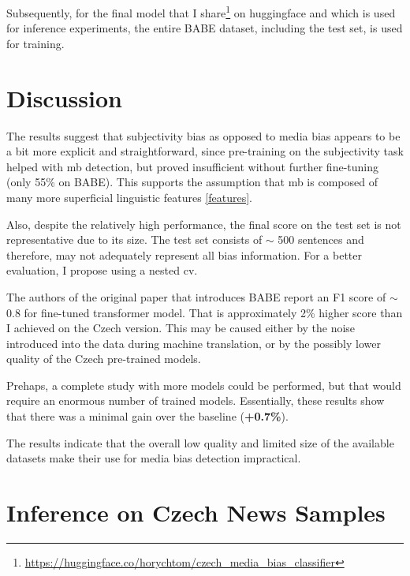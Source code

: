 Subsequently, for the final model that I share\footnote{\url{https://huggingface.co/horychtom/czech_media_bias_classifier}} on huggingface and which is used for inference experiments, the entire BABE dataset, including the test set, is used for training.

\section{Discussion}
The results suggest that subjectivity bias as opposed to media bias appears to be a bit more explicit and straightforward, since pre-training on the subjectivity task helped with \gls{mb} detection, but proved insufficient without further fine-tuning (only 55\% on BABE). This supports the assumption that \gls{mb} is composed of many more superficial linguistic features \ref{features}.

Also, despite the relatively high performance, the final score on the test set is not representative due to its size. The test set consists of $\sim$ 500 sentences and therefore, may not adequately represent all bias information. For a better evaluation, I propose using a nested \gls{cv}.

The authors of the original paper that introduces BABE \cite{spinde2021neural} report an F1 score of $\sim$ 0.8 for fine-tuned transformer model. That is approximately 2\% higher score than I achieved on the Czech version. This may be caused either by the noise introduced into the data during machine translation, or by the possibly lower quality of the Czech pre-trained models.

Prehaps, a complete study with more models could be performed, but that would require an enormous number of trained models. Essentially, these results show that there was a minimal gain over the baseline (\textbf{+0.7\%}).

The results indicate that the overall low quality and limited size of the available datasets make their use for media bias detection impractical.







\newpage

\section{Inference on Czech News Samples}\label{inference}

